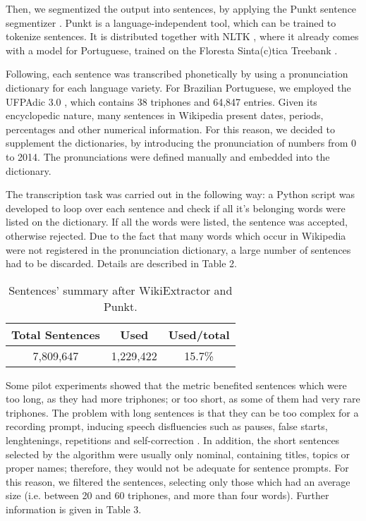 Then, we segmentized the output into sentences, by applying the Punkt sentence segmentizer \cite{Kiss2006}. Punkt is a
language-independent tool, which can be trained to tokenize sentences. It is distributed together with NLTK \cite{NLTK2009}, where it 
already comes with a model for Portuguese, trained on the Floresta Sinta(c)tica Treebank \cite{Floresta2008}.

Following, each sentence was transcribed phonetically by using a pronunciation dictionary for each language variety. 
For Brazilian Portuguese, we employed the UFPAdic 3.0 \cite{Neto2011}, which contains 38 triphones and 64,847 entries. Given 
its encyclopedic nature, many sentences in Wikipedia present dates, periods, percentages and other numerical information. 
For this reason, we decided to supplement the dictionaries, by introducing the pronunciation of numbers from 0 to 2014. The
pronunciations were defined manually and embedded into the dictionary.

The transcription task was carried out in the following way: a Python script was developed to loop over each sentence 
and check if all it's belonging words were listed on the dictionary. If all the words were listed, the sentence was 
accepted, otherwise rejected. Due to the fact that many words which occur in Wikipedia were not registered in the 
pronunciation dictionary, a large number of sentences had to be discarded. Details are described in Table 2.

\begin{table}[H]
\begin{center}
\begin{tabular}{|c|c|c|}
\hline \bf Total Sentences & \bf Used & \bf Used/total\\ \hline
7,809,647 & 1,229,422 & 15.7\% \\
\hline
\end{tabular}
\end{center}
\caption{\label{wikipedia-used-discarded} Sentences' summary after WikiExtractor and Punkt.}
\end{table}

Some pilot experiments showed that the metric benefited sentences which were too long, as they had more 
triphones; or too short, as some of them had very rare triphones. The problem with long sentences is that they
can be too complex for a recording prompt, inducing speech disfluencies such as pauses, false starts, 
lenghtenings, repetitions and self-correction \cite{Watanabe2012}. In addition, the short sentences selected by
the algorithm were usually only nominal, containing titles, topics or proper names; therefore, they would
not be adequate for sentence prompts. For this reason, we filtered the sentences, selecting only those which had
an average size (i.e. between 20 and 60 triphones, and more than four words). Further information is given in Table 3.


